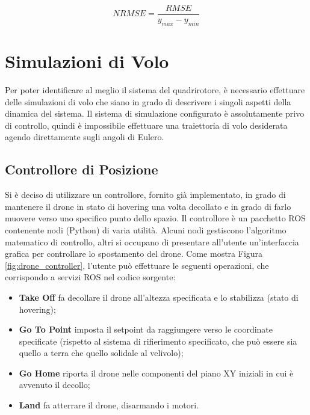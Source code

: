 \begin{equation}
	NRMSE = \frac{RMSE}{y_{max} - y_{min}}
	\label{nrmse}
\end{equation}

\section{Simulazioni di Volo}
Per poter identificare al meglio il sistema del quadrirotore, è necessario effettuare delle simulazioni di volo che siano in grado di descrivere i singoli aspetti della dinamica del sistema. Il sistema di simulazione configurato è assolutamente privo di controllo, quindi è impossibile effettuare una traiettoria di volo desiderata agendo direttamente sugli angoli di Eulero.\\

\subsection{Controllore di Posizione}
Si è deciso di utilizzare un controllore, fornito già implementato, in grado di mantenere il drone in stato di hovering una volta decollato e in grado di farlo muovere verso uno specifico punto dello spazio. Il controllore è un pacchetto \acs{ROS} contenente nodi (Python) di varia utilità. Alcuni nodi gestiscono l'algoritmo matematico di controllo, altri si occupano di presentare all'utente un'interfaccia grafica per controllare lo spostamento del drone. Come mostra Figura \ref{fig:drone_controller}, l'utente può effettuare le seguenti operazioni, che corrispondo a servizi \acs{ROS} nel codice sorgente:
\begin{itemize}
	\item \textbf{Take Off} fa decollare il drone all'altezza specificata e lo stabilizza (stato di hovering);
	\item \textbf{Go To Point} imposta il setpoint da raggiungere verso le coordinate specificate (rispetto al sistema di rifierimento specificato, che può essere sia quello a terra che quello solidale al velivolo);
	\item \textbf{Go Home} riporta il drone nelle componenti del piano XY iniziali in cui è avvenuto il decollo;
	\item \textbf{Land} fa atterrare il drone, disarmando i motori.
\end{itemize}


